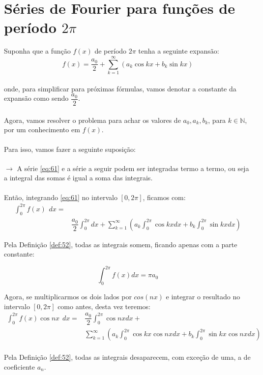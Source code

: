 \chapter{Séries de Fourier para funções de período $2\pi$}
Suponha que a função $f(x)$ de período $2\pi$ tenha a seguinte expansão:\\
\begin{equation}
    f(x) = \dfrac{a_0}{2} + \sum\limits_{k=1}^{\infty}(a_k\cos{kx} + b_k\sin{kx})
\label{eq:61}
\end{equation}
\\
onde, para simplificar para próximas fórmulas, vamos denotar a constante da 
expansão como sendo $\dfrac{a_0}{2}$.\\
\\
Agora, vamos resolver o problema para achar os valores de $a_0, a_k, b_k$, para
\mbox{$k \in \mathbb{N}$}, por um conhecimento em $f(x)$.\\
\\
Para isso, vamos fazer a seguinte suposição:\\
\\
$\to$ A série \ref{eq:61} e a série a seguir podem ser integradas termo a termo, ou seja
a integral das somas é igual a soma das integrais.
\\
\\
Então, integrando \ref{eq:61} no intervalo $[0, 2\pi]$, ficamos com:\\
\begin{equation}
\begin{split}
    \int_{0}^{2\pi} f(x)\hspace{5pt}dx = &\\
     &\dfrac{a_0}{2}\int_{0}^{2\pi}dx + \sum\limits_{k=1}^{\infty}(a_k\int_{0}^{2\pi}\cos{kx}dx + b_k\int_{0}^{2\pi}\sin{kx}dx)
\end{split}
\end{equation}

Pela Definição \ref{def:52}, todas as integrais somem, ficando apenas com a parte 
constante:

\begin{equation}
    \int_{0}^{2\pi}f(x) dx = \pi a_0
    \label{eq:62}
\end{equation}

Agora, se multiplicarmos os dois lados por $cos(nx)$ e integrar o resultado no 
intervalo $[0, 2\pi]$ como antes, desta vez teremos:\\

\begin{equation}
\begin{split}
    \int_{0}^{2\pi} f(x)\cos{nx}\hspace{5pt}dx = &\dfrac{a_0}{2}\int_{0}^{2\pi}\cos{nx}dx + \\
    &\sum\limits_{k=1}^{\infty}(a_k\int_{0}^{2\pi}\cos{kx}\cos{nx}dx + b_k\int_{0}^{2\pi}\sin{kx}\cos{nx}dx)
\end{split}
\end{equation}
\\
Pela Definição \ref{def:52}, todas as integrais desaparecem, com exceção de uma, a 
de coeficiente $a_n$.

